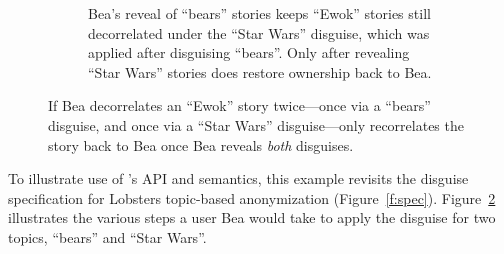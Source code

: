 \begin{figure}
\begin{subfigure}[t]{.47\columnwidth}
  \caption{Bea's reveal of ``bears'' stories keeps ``Ewok'' stories still
    decorrelated under the ``Star Wars'' disguise, which was applied after
    disguising ``bears''. Only after revealing ``Star Wars'' stories does \sys
    restore ownership back to Bea.}
\label{f:composition-hl-ooo}
\end{subfigure}
    \caption[\sys only reveals the original state of data disguised multiple times once
    all disguises appied to the data have been revealed.]{
        If Bea decorrelates an ``Ewok'' story twice---once via a ``bears''
        disguise, and once via a ``Star Wars'' disguise---\sys only recorrelates
        the story back to Bea once Bea reveals \emph{both} disguises.}
\label{f:composition-hl}
\end{figure}

%
To illustrate use of \sys's API and semantics, this example revisits the disguise 
specification for Lobsters topic-based anonymization (Figure~\ref{f:spec}). 
Figure~\ref{f:composition-hl} illustrates the various steps a user Bea would
take to apply the disguise for two topics, ``bears'' and ``Star Wars''.

